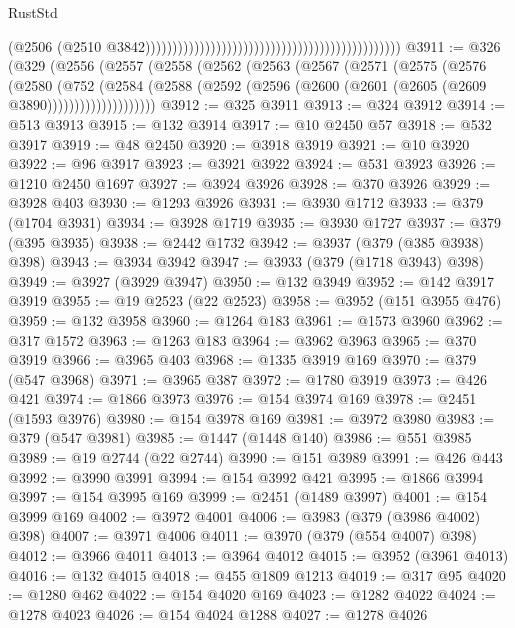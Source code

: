 \begin{lexlean}{RustStd}
\begin{coremodule}
{\begin{coremodule}
{{{{{{{{{{{{{{{{{{{{{{{{{{{{{{{{{{{{{{{{{{{{{{{{{{{{{{{{{{{{{{{{{{{{{{{{{{{{{{{{                                                                                              (@2506
                                                                                                (@2510
                                                                                                  @3842)))))))))))))))))))))))))))))))))))))))))))))))
@3911 := @326
    (@329
      (@2556
        (@2557
          (@2558
            (@2562
              (@2563
                (@2567
                  (@2571
                    (@2575
                      (@2576
                        (@2580
                          (@752
                            (@2584
                              (@2588
                                (@2592 (@2596 (@2600 (@2601 (@2605 (@2609 @3890))))))))))))))))))))
@3912 := @325 @3911
@3913 := @324 @3912
@3914 := @513 @3913
@3915 := @132 @3914
@3917 := @10 @2450 @57
@3918 := @532 @3917
@3919 := @48 @2450
@3920 := @3918 @3919
@3921 := @10 @3920
@3922 := @96 @3917
@3923 := @3921 @3922
@3924 := @531 @3923
@3926 := @1210 @2450 @1697
@3927 := @3924 @3926
@3928 := @370 @3926
@3929 := @3928 @403
@3930 := @1293 @3926
@3931 := @3930 @1712
@3933 := @379 (@1704 @3931)
@3934 := @3928 @1719
@3935 := @3930 @1727
@3937 := @379 (@395 @3935)
@3938 := @2442 @1732
@3942 := @3937 (@379 (@385 @3938) @398)
@3943 := @3934 @3942
@3947 := @3933 (@379 (@1718 @3943) @398)
@3949 := @3927 (@3929 @3947)
@3950 := @132 @3949
@3952 := @142 @3917 @3919
@3955 := @19 @2523 (@22 @2523)
@3958 := @3952 (@151 @3955 @476)
@3959 := @132 @3958
@3960 := @1264 @183
@3961 := @1573 @3960
@3962 := @317 @1572
@3963 := @1263 @183
@3964 := @3962 @3963
@3965 := @370 @3919
@3966 := @3965 @403
@3968 := @1335 @3919 @169
@3970 := @379 (@547 @3968)
@3971 := @3965 @387
@3972 := @1780 @3919
@3973 := @426 @421
@3974 := @1866 @3973
@3976 := @154 @3974 @169
@3978 := @2451 (@1593 @3976)
@3980 := @154 @3978 @169
@3981 := @3972 @3980
@3983 := @379 (@547 @3981)
@3985 := @1447 (@1448 @140)
@3986 := @551 @3985
@3989 := @19 @2744 (@22 @2744)
@3990 := @151 @3989
@3991 := @426 @443
@3992 := @3990 @3991
@3994 := @154 @3992 @421
@3995 := @1866 @3994
@3997 := @154 @3995 @169
@3999 := @2451 (@1489 @3997)
@4001 := @154 @3999 @169
@4002 := @3972 @4001
@4006 := @3983 (@379 (@3986 @4002) @398)
@4007 := @3971 @4006
@4011 := @3970 (@379 (@554 @4007) @398)
@4012 := @3966 @4011
@4013 := @3964 @4012
@4015 := @3952 (@3961 @4013)
@4016 := @132 @4015
@4018 := @455 @1809 @1213
@4019 := @317 @95
@4020 := @1280 @462
@4022 := @154 @4020 @169
@4023 := @1282 @4022
@4024 := @1278 @4023
@4026 := @154 @4024 @1288
@4027 := @1278 @4026
}}}}}}}}}}}}}}}}}}}}}}}}}}}}}}}}}}}}}}}}}}}}}}}}}}}}}}}}}}}}}}}}}}}}}}}}}}}}}}}}
\end{coremodule}}
\end{coremodule}
\end{lexlean}
